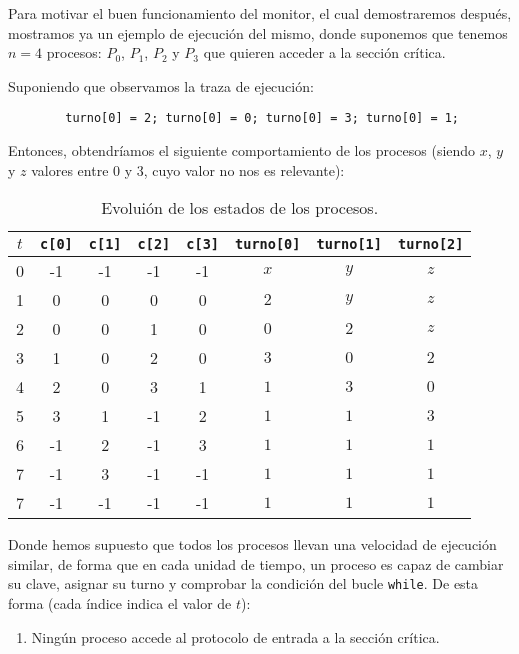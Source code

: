 \begin{ejemplo}
    Para motivar el buen funcionamiento del monitor, el cual demostraremos después, mostramos ya un ejemplo de ejecución del mismo, donde suponemos que tenemos $n=4$ procesos: $P_0$, $P_1$, $P_2$ y $P_3$ que quieren acceder a la sección crítica.

    Suponiendo que observamos la traza de ejecución:
    \begin{verbatim}
        turno[0] = 2; turno[0] = 0; turno[0] = 3; turno[0] = 1;
    \end{verbatim}
    Entonces, obtendríamos el siguiente comportamiento de los procesos (siendo $x$, $y$ y $z$ valores entre 0 y 3, cuyo valor no nos es relevante):
    \begin{table}[H]
    \centering
    \begin{tabular}{|c|c|c|c|c|c|c|c|}
        \hline
        $t$ & \verb|c[0]| & \verb|c[1]| & \verb|c[2]| & \verb|c[3]| & \verb|turno[0]| & \verb|turno[1]| & \verb|turno[2]| \\
        \hline
        0 & -1 & -1 & -1 & -1 & $x$ & $y$ & $z$ \\
        \hline
        1 & 0 & 0 & 0 & 0 & $2$ & $y$ & $z$ \\
        \hline
        2 & 0 & 0 & 1 & 0 & $0$ & $2$ & $z$ \\
        \hline
        3 & 1 & 0 & 2 & 0 & $3$ & $0$ & $2$ \\
        \hline
        4 & 2 & 0 & 3 & 1 & $1$ & $3$ & $0$ \\
        \hline
        5 & 3 & 1 & -1 & 2 & $1$ & $1$ & $3$ \\
        \hline
        6 & -1 & 2 & -1 & 3 & $1$ & $1$ & $1$ \\
        \hline
        7 & -1 & 3 & -1 & -1 & $1$ & $1$ & $1$ \\
        \hline
        7 & -1 & -1 & -1 & -1 & $1$ & $1$ & $1$ \\
        \hline
    \end{tabular}
    \caption{Evoluión de los estados de los procesos.}
    \end{table}
    Donde hemos supuesto que todos los procesos llevan una velocidad de ejecución similar, de forma que en cada unidad de tiempo, un proceso es capaz de cambiar su clave, asignar su turno y comprobar la condición del bucle \verb|while|. De esta forma (cada índice indica el valor de $t$):
    \begin{enumerate}[label=(\arabic*), start=0]
        \item Ningún proceso accede al protocolo de entrada a la sección crítica.

\end{enumerate}
\end{ejemplo}
